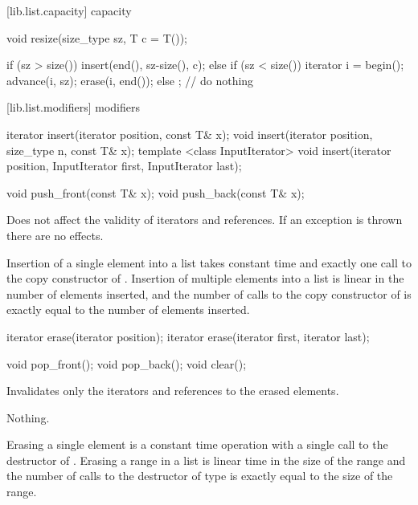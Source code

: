 [lib.list.capacity]{ capacity}

%
\begin{itemdecl}
void resize(size_type sz, T c = T());
\end{itemdecl}

\begin{itemdescr}
\pnum
\effects
\begin{codeblock}
    if (sz > size())
      insert(end(), sz-size(), c);
    else if (sz < size()) {
      iterator i = begin();
      advance(i, sz);
      erase(i, end());
    }
    else
      ;                             // do nothing
\end{codeblock}
\end{itemdescr}

[lib.list.modifiers]{ modifiers}

%
\begin{itemdecl}
iterator insert(iterator position, const T& x);
void     insert(iterator position, size_type n, const T& x);
template <class InputIterator>
  void insert(iterator position, InputIterator first,
              InputIterator last);

void push_front(const T& x);
void push_back(const T& x);
\end{itemdecl}

\begin{itemdescr}
\pnum
\notes
Does not affect the validity of iterators and references.
If an exception is thrown there are no effects.

\pnum
\complexity
Insertion of a single element into a list takes constant time and
exactly one call to the copy constructor of
. Insertion of multiple elements into a list is linear in the
number of elements inserted, and the number of calls to the copy
constructor of  is exactly equal
to the number of elements inserted.
\end{itemdescr}

%
\begin{itemdecl}
iterator erase(iterator position);
iterator erase(iterator first, iterator last);

void pop_front();
void pop_back();
void clear();
\end{itemdecl}

\begin{itemdescr}
\pnum
\effects
Invalidates only the iterators and references to the erased elements.

\pnum
\throws Nothing.

\pnum
\complexity
Erasing a single element is a constant time operation with a single call to the destructor of
.
Erasing a range in a list is linear time in the
size of the range and the number of calls to the destructor of type
is exactly equal to the size of the range.
\end{itemdescr}

